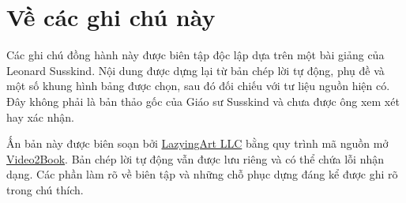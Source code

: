 \documentclass[11pt,oneside]{book}
\begin{document}
\frontmatter
\hypersetup{pageanchor=false}

\hypersetup{pageanchor=true}

\clearpage
\chapter{Về các ghi chú này}
Các ghi chú đồng hành này được biên tập độc lập dựa trên một bài giảng của Leonard
Susskind. Nội dung được dựng lại từ bản chép lời tự động, phụ đề
và một số khung hình bảng được chọn, sau đó đối chiếu với tư liệu nguồn
hiện có. Đây không phải là bản thảo gốc của Giáo sư Susskind và
chưa được ông xem xét hay xác nhận.

Ấn bản này được biên soạn bởi \href{https://lazying.art}{LazyingArt LLC}
bằng quy trình mã nguồn mở
\href{https://github.com/lachlanchen/Video2Book}{Video2Book}.
Bản chép lời tự động vẫn được lưu riêng và có thể chứa
lỗi nhận dạng. Các phần làm rõ về biên tập và những chỗ phục dựng đáng kể
được ghi rõ trong chú thích.
\clearpage
\tableofcontents
\mainmatter
\graphicspath{{../../../generated_course_notes/supplementary/higgs_boson/2012_summer/chapters/lecture_01/}{../../../generated_course_notes/supplementary/higgs_boson/2012_summer/figures/}{../../../generated_course_notes/supplementary/higgs_boson/2012_summer/assets/}}

\end{document}
